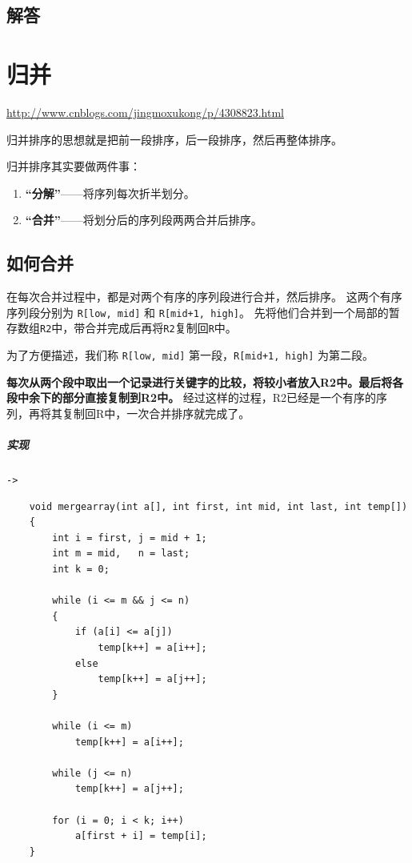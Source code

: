 \documentclass[UTF8,a4paper,12pt]{ctexbook}
\begin{document}
	\subsection{解答}
	
\section{归并}
	
	\url{http://www.cnblogs.com/jingmoxukong/p/4308823.html}
	
	归并排序的思想就是把前一段排序，后一段排序，然后再整体排序。
	
	归并排序其实要做两件事：
	\begin{enumerate}[itemindent = 2em]
	  \item \textbf{“分解”}——将序列每次折半划分。
	  \item \textbf{“合并”}——将划分后的序列段两两合并后排序。
	\end{enumerate}
	
	\subsection{如何合并}
		在每次合并过程中，都是对两个有序的序列段进行合并，然后排序。	这两个有序序列段分别为 \verb|R[low, mid]| 和 \verb|R[mid+1, high]|。
		先将他们合并到一个局部的暂存数组\verb|R2|中，带合并完成后再将\verb|R2|复制回\verb|R|中。
	
		为了方便描述，我们称 \verb|R[low, mid]| 第一段，\verb|R[mid+1, high]| 为第二段。
		
		\textbf{每次从两个段中取出一个记录进行关键字的比较，将较小者放入R2中。最后将各段中余下的部分直接复制到R2中。}
		经过这样的过程，R2已经是一个有序的序列，再将其复制回R中，一次合并排序就完成了。
		
		\subparagraph{实现}\verb|->|
			\begin{lstlisting}
	void mergearray(int a[], int first, int mid, int last, int temp[])  
	{  
		int i = first, j = mid + 1;  
		int m = mid,   n = last;  
		int k = 0;  
		
		while (i <= m && j <= n)  
		{  
			if (a[i] <= a[j])  
				temp[k++] = a[i++];  
			else  
				temp[k++] = a[j++];  
		}  
		
		while (i <= m)  
			temp[k++] = a[i++];  
		
		while (j <= n)  
			temp[k++] = a[j++];  
		
		for (i = 0; i < k; i++)  
			a[first + i] = temp[i];  
	}  
			\end{lstlisting}
		
\end{document}
